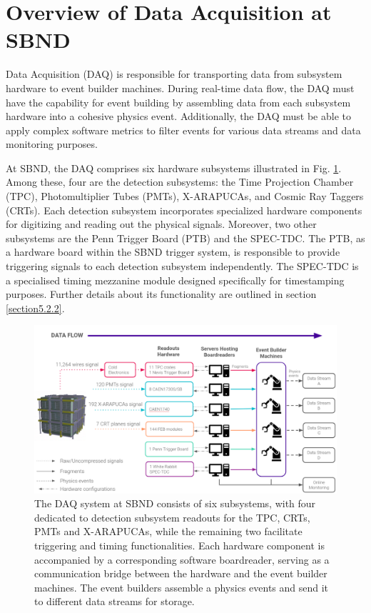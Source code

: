 \section{Overview of Data Acquisition at SBND}
\label{section5.1}

Data Acquisition (DAQ) is responsible for transporting data from subsystem hardware to event builder machines.
During real-time data flow, the DAQ must have the capability for event building by assembling data from each subsystem hardware into a cohesive physics event. 
Additionally, the DAQ must be able to apply complex software metrics to filter events for various data streams and data monitoring purposes.

At SBND, the DAQ comprises six hardware subsystems illustrated in Fig. \ref{fig:daq_overview}.
Among these, four are the detection subsystems: the Time Projection Chamber (TPC), Photomultiplier Tubes (PMTs), X-ARAPUCAs, and Cosmic Ray Taggers (CRTs).
Each detection subsystem incorporates specialized hardware components for digitizing and reading out the physical signals. 
Moreover, two other subsystems are the Penn Trigger Board (PTB) \cite{ptb_gvs} and the SPEC-TDC. 
The PTB, as a hardware board within the SBND trigger system, is responsible to provide triggering signals to each detection subsystem independently.
The SPEC-TDC is a specialised timing mezzanine module designed specifically for timestamping purposes.
Further details about its functionality are outlined in section \ref{section5.2.2}.

\begin{figure}[htbp!] 
\centering    
\includegraphics[width=1.0\textwidth]{DAQ_Overview}
\caption[DAQ_Overview]{The DAQ system at SBND consists of six subsystems, with four dedicated to detection subsystem readouts for the TPC, CRTs, PMTs and X-ARAPUCAs, while the remaining two facilitate triggering and timing functionalities.
Each hardware component is accompanied by a corresponding software boardreader, serving as a communication bridge between the hardware and the event builder machines.
The event builders assemble a physics events and send it to different data streams for storage.
}
\label{fig:daq_overview}
\end{figure}

